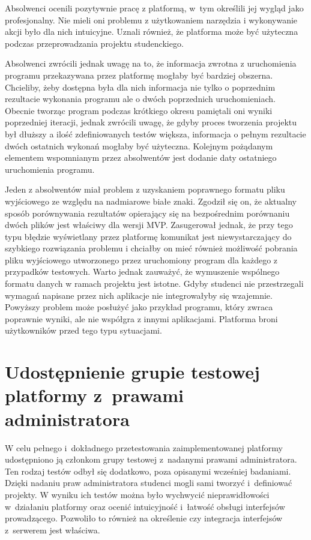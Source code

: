 Absolwenci ocenili pozytywnie pracę z platformą, w~tym określili jej wygląd jako profesjonalny.
Nie mieli oni problemu z użytkowaniem narzędzia i wykonywanie akcji było dla nich intuicyjne.
Uznali również, że platforma może być użyteczna podczas przeprowadzania projektu studenckiego.

Absolwenci zwrócili jednak uwagę na to, że informacja zwrotna z uruchomienia programu przekazywana przez platformę mogłaby być bardziej obszerna.
Chcieliby, żeby dostępna była dla nich informacja nie tylko o poprzednim rezultacie wykonania programu ale o dwóch poprzednich uruchomieniach.
Obecnie tworząc program podczas krótkiego okresu pamiętali oni wyniki poprzedniej iteracji, jednak zwrócili uwagę, że gdyby proces tworzenia projektu był dłuższy a ilość zdefiniowanych testów większa, informacja o pełnym rezultacie dwóch ostatnich wykonań mogłaby być użyteczna.
Kolejnym pożądanym elementem wspomnianym przez absolwentów jest dodanie daty ostatniego uruchomienia programu.

Jeden z absolwentów miał problem z uzyskaniem poprawnego formatu pliku wyjściowego ze względu na nadmiarowe białe znaki.
Zgodził się on, że aktualny sposób porównywania rezultatów opierający się na bezpośrednim porównaniu dwóch plików jest właściwy dla wersji MVP.
Zasugerował jednak, że przy tego typu błędzie wyświetlany przez platformę komunikat jest niewystarczający do szybkiego rozwiązania problemu i chciałby on mieć również możliwość pobrania pliku wyjściowego utworzonego przez uruchomiony program dla każdego z przypadków testowych.
Warto jednak zauważyć, że wymuszenie wspólnego formatu danych w ramach projektu jest istotne.
Gdyby studenci nie przestrzegali wymagań napisane przez nich aplikacje nie integrowałyby się wzajemnie.
Powyższy problem może posłużyć jako przykład programu, który zwraca poprawnie wyniki, ale nie współgra z innymi aplikacjami.
Platforma broni użytkowników przed tego typu sytuacjami.

\section{Udostępnienie grupie testowej platformy z~prawami administratora}

W celu pełnego i~dokładnego przetestowania zaimplementowanej platformy udostępniono ją członkom grupy testowej z~nadanymi prawami administratora.
Ten rodzaj testów odbył się dodatkowo, poza opisanymi wcześniej badaniami.
Dzięki nadaniu praw administratora studenci mogli sami tworzyć i~definiować projekty.
W wyniku ich testów można było wychwycić nieprawidłowości w~działaniu platformy oraz ocenić intuicyjność i~łatwość obsługi interfejsów prowadzącego.
Pozwoliło to również na określenie czy integracja interfejsów z~serwerem jest właściwa.

